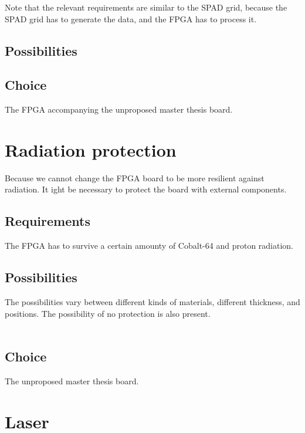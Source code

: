 Note that the relevant requirements are similar to the SPAD grid, because the SPAD grid has to generate the data, and the FPGA has to process it. 

\subsection{Possibilities} 
\label{ssec:grid_pos}

\subsection{Choice} 
\label{ssec:grid_choice}
The FPGA accompanying the unproposed master thesis board.

\section{Radiation protection} 
\label{sec:radiation_protection}

Because we cannot change the FPGA board to be more resilient against radiation. It  ight be necessary to protect the board with external components. 
\subsection{Requirements} 
\label{ssec:grid_req}

The FPGA has to survive a certain amounty of Cobalt-64 and proton radiation.

\subsection{Possibilities} 
\label{ssec:grid_pos}
The possibilities vary between different kinds of materials, different thickness, and positions. The possibility of no protection is also present.\\
\\


\subsection{Choice} 
\label{ssec:grid_choice}
The unproposed master thesis board.

\section{Laser} 
\label{sec:laser}
